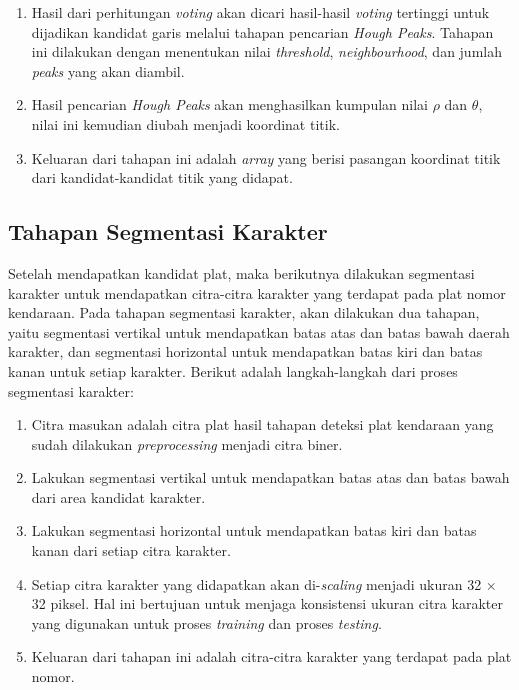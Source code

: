 \begin{enumerate}
\item Hasil dari perhitungan \textit{voting} akan dicari hasil-hasil \textit{voting} tertinggi untuk dijadikan kandidat garis melalui tahapan pencarian \textit{Hough Peaks}. Tahapan ini dilakukan dengan menentukan nilai \textit{threshold}, \textit{neighbourhood}, dan jumlah \textit{peaks} yang akan diambil.
\item Hasil pencarian \textit{Hough Peaks} akan menghasilkan kumpulan nilai $\rho$ dan $\theta$, nilai ini kemudian diubah menjadi koordinat titik.
\item Keluaran dari tahapan ini adalah \textit{array} yang berisi pasangan koordinat titik dari kandidat-kandidat titik yang didapat.\\
\end{enumerate}

\subsection{Tahapan Segmentasi Karakter}
\noindent Setelah mendapatkan kandidat plat, maka berikutnya dilakukan segmentasi karakter untuk mendapatkan citra-citra karakter yang terdapat pada plat nomor kendaraan. Pada tahapan segmentasi karakter, akan dilakukan dua tahapan, yaitu segmentasi vertikal untuk mendapatkan batas atas dan batas bawah daerah karakter, dan segmentasi horizontal untuk mendapatkan batas kiri dan batas kanan untuk setiap karakter. Berikut adalah langkah-langkah dari proses segmentasi karakter:
\begin{enumerate}
\item Citra masukan adalah citra plat hasil tahapan deteksi plat kendaraan yang sudah dilakukan \textit{preprocessing} menjadi citra biner.
\item Lakukan segmentasi vertikal untuk mendapatkan batas atas dan batas bawah dari area kandidat karakter.
\item Lakukan segmentasi horizontal untuk mendapatkan batas kiri dan batas kanan dari setiap citra karakter.
\item Setiap citra karakter yang didapatkan akan di-\textit{scaling} menjadi ukuran 32 $\times$ 32 piksel. Hal ini bertujuan untuk menjaga konsistensi ukuran citra karakter yang digunakan untuk proses \textit{training} dan proses \textit{testing}.
\item Keluaran dari tahapan ini adalah citra-citra karakter yang terdapat pada plat nomor.
\end{enumerate}

